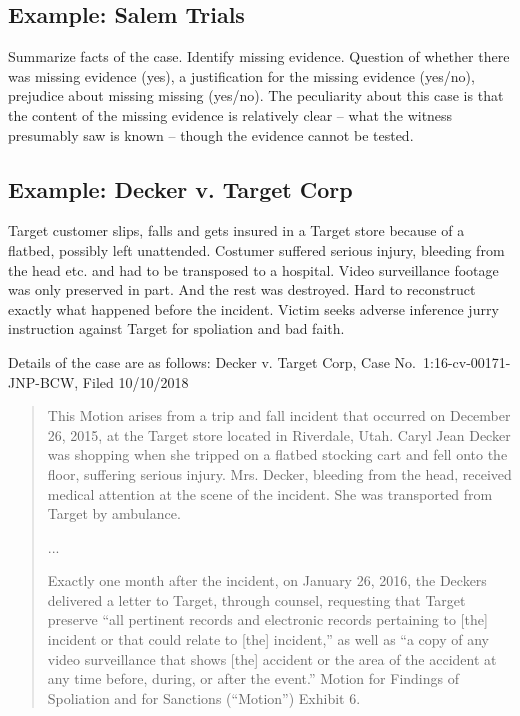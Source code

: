 \documentclass[
  10pt,
  dvipsnames,enabledeprecatedfontcommands]{scrartcl}
\begin{document}
\hypertarget{example-salem-trials}{%
\subsection{Example: Salem Trials}\label{example-salem-trials}}

Summarize facts of the case. Identify missing evidence. Question of
whether there was missing evidence (yes), a justification for the
missing evidence (yes/no), prejudice about missing missing (yes/no). The
peculiarity about this case is that the content of the missing evidence
is relatively clear -- what the witness presumably saw is known --
though the evidence cannot be tested.

\hypertarget{example-decker-v.-target-corp}{%
\subsection{Example: Decker v. Target
Corp}\label{example-decker-v.-target-corp}}

Target customer slips, falls and gets insured  in a
Target store because of a flatbed, possibly left unattended. Costumer
suffered serious injury, bleeding from the head etc. and had to be
transposed to a hospital. Video surveillance footage was only preserved
in part. And the rest was destroyed. Hard to reconstruct exactly what
happened before the incident. Victim seeks adverse inference jurry
instruction against Target for spoliation and bad faith.

Details of the case are as follows: Decker v. Target Corp, Case
No.~1:16-cv-00171-JNP-BCW, Filed 10/10/2018

\begin{quote}
This Motion arises from a trip and fall incident that occurred on December 26, 2015, at the Target store
located in Riverdale, Utah. Caryl Jean Decker was shopping when she tripped on a flatbed stocking cart and
fell onto the floor, suffering serious injury. Mrs. Decker, bleeding from the head, received medical attention at the scene of the incident. She was transported from Target by ambulance.

...

Exactly one month after the incident, on January 26, 2016, the Deckers delivered a letter to Target, through
counsel, requesting that Target preserve “all pertinent records and electronic records pertaining to [the]
incident or that could relate to [the] incident,” as well as “a copy of any video surveillance that shows [the] accident or the area of the accident at any time before, during, or after the event.” Motion for Findings of Spoliation and for Sanctions (“Motion”) Exhibit 6.
\end{quote}
\end{document}

